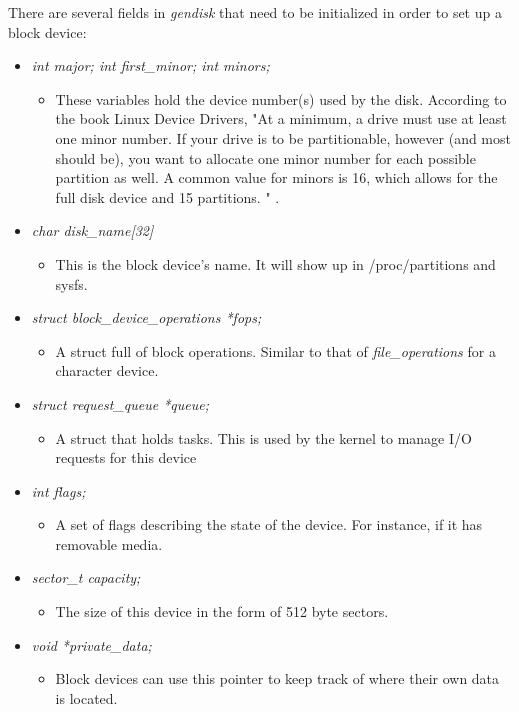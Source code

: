 \documentclass[onecolumn,draftclsnofoot, 10pt, compsoc]{IEEEtran}
\begin{document}
			There are several fields in \textit{gendisk} that need to be initialized in order to set up a block device:
			\begin{itemize}
				\item \textit{int major; int first\_minor; int minors;}
				\begin{itemize}
					\item These variables hold the device number(s) used by the disk. According to the book Linux Device Drivers, "At a minimum, a drive must use at least one minor number. If your drive is to be partitionable, however (and most should be), you want to allocate one minor number for each possible partition as well. A common value for minors is 16, which allows for the full disk device and 15 partitions. " \cite{implLinuxBlock}.
				\end{itemize}
		
				\item \textit{char disk\_name[32]}
				\begin{itemize}
					\item This is the block device's name. It will show up in /proc/partitions and sysfs.
				\end{itemize}
		
				\item \textit{struct block\_device\_operations *fops;}
				\begin{itemize}
					\item A struct full of block operations. Similar to that of \textit{file\_operations} for a character device.
				\end{itemize}
				
				\item \textit{struct request\_queue *queue;}
				\begin{itemize}
					\item A struct that holds tasks. This is used by the kernel to manage I/O requests for this device
				\end{itemize}
		
				\item \textit{int flags;}
				\begin{itemize}
					\item A set of flags describing the state of the device. For instance, if it has removable media.
				\end{itemize}
				
				\item \textit{sector\_t capacity;}
				\begin{itemize}
					\item The size of this device in the form of 512 byte sectors.
				\end{itemize}
		
				\item \textit{void *private\_data;}
				\begin{itemize}
					\item Block devices can use this pointer to keep track of where their own data is located.
				\end{itemize}
			\end{itemize}
		
\end{document}
